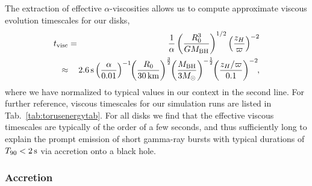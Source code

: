 The extraction of effective $\alpha$-viscosities allows us to compute approximate viscous evolution timescales for our disks,
\begin{eqnarray}
	t_{\rm visc} &=& \frac{1}{\alpha}\left(\frac{R_0^{3}}{GM_{\rm BH}}\right)^{1/2}\left(\frac{z_H}{\varpi}\right)^{-2} \label{eq:tvisc} \\
	\approx&& \mskip-15mu 2.6\,{\rm s} \left( \frac{\alpha}{0.01}\right)^{-1}\mskip-5mu\left(\frac{R_0}{30\,{\rm km}}\right)^{\frac{3}{2}} \mskip-5mu\left(\frac{M_{\rm BH}}{3M_\odot}\right)^{-\frac{1}{2}} \mskip-5mu\left(\frac{z_H/\varpi}{0.1}\right)^{-2}\mskip-5mu, \nonumber
\end{eqnarray}
where we have normalized to typical values in our context in the second line. For further reference, viscous timescales for our simulation runs are listed in Tab.~\ref{tab:torusenergytab}. For all disks we find that the effective viscous timescales are typically of the order of a few seconds, and thus sufficiently long to explain the prompt emission of short gamma-ray bursts with typical durations of $T_{90}<2\,{\rm s}$ via accretion onto a black hole.





\subsubsection{Accretion}
\label{sec:accretion}

